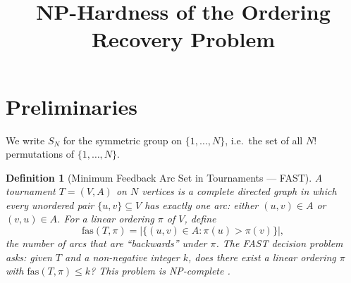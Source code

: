 \documentclass[11pt]{article}
\title{NP-Hardness of the Ordering Recovery Problem}
\date{}
\newtheorem{definition}{Definition}
\begin{document}
\maketitle

\section{Preliminaries}

We write $S_N$ for the symmetric group on $\{1, \ldots, N\}$, i.e.\ the set of all $N!$ permutations of $\{1, \ldots, N\}$.

\begin{definition}[Minimum Feedback Arc Set in Tournaments --- FAST]
A tournament $T = (V, A)$ on $N$ vertices is a complete directed graph in which every unordered pair $\{u, v\} \subseteq V$ has exactly one arc: either $(u, v) \in A$ or $(v, u) \in A$. For a linear ordering $\pi$ of $V$, define
\begin{equation}
\mathrm{fas}(T, \pi) = \bigl|\{(u, v) \in A : \pi(u) > \pi(v)\}\bigr|,
\end{equation}
the number of arcs that are ``backwards'' under $\pi$. The FAST decision problem asks: given $T$ and a non-negative integer $k$, does there exist a linear ordering $\pi$ with $\mathrm{fas}(T, \pi) \le k$? This problem is NP-complete \cite{alon2006,charbit2007}.
\end{definition}
\end{document}
